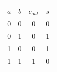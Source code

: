 \begin{tabular}{cc|cc}\toprule
$a$&$b$&$c_{out}$&$s$\\\midrule
0&0&0&0\\0&1&0&1\\1&0&0&1\\1&1&1&0\\\bottomrule
\end{tabular}